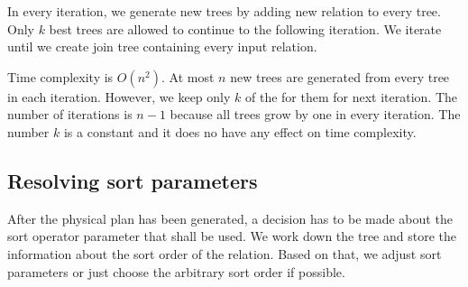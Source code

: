 In every iteration, we generate new trees by adding new relation to every tree. Only $k$ best trees are allowed to continue to the following iteration. We iterate until we create join tree containing every input relation.
 
 Time complexity is $O(n^2)$. At most $n$ new trees are generated from every tree in each iteration. However, we keep only $k$ of the for them for next iteration. The number of iterations is $n-1$ because all trees grow by one in every iteration. The number $k$ is a constant and it does no have any effect on time complexity.
 
\subsection{Resolving sort parameters}

After the physical plan has been generated, a decision has to be made about the sort operator parameter that shall be used. We work down the tree and store the information about the sort order of the relation. Based on that, we adjust sort parameters or just choose the arbitrary sort order if possible.

